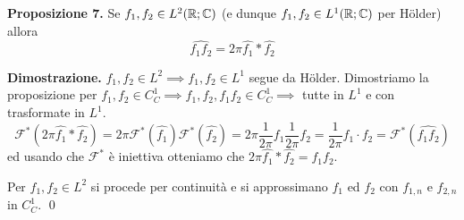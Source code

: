 \textbf{Proposizione 7.}
Se $f_1, f_2 \in L^2(\mathbb R; \mathbb C)$ (e dunque $f_1, f_2 \in L^1(\mathbb R; \mathbb C)$ per H\"older) allora
$$
\hat{f_1 f_2} = 2\pi \hat{f_1} \ast \hat{f_2}
$$

\textbf{Dimostrazione.}
$f_1, f_2 \in L^2 \implies f_1, f_2 \in L^1$ segue da H\"older. Dimostriamo la proposizione per $f_1, f_2 \in C_C^1 \implies f_1, f_2, f_1 f_2 \in C_C^1 \implies$ tutte in $L^1$ e con trasformate in $L^1$.
$$
\mathcal F^*(2\pi \hat{f_1} \ast \hat{f_2})
= 2\pi \mathcal F^*(\hat{f_1}) \mathcal F^*(\hat{f_2})
= 2\pi \frac{1}{2\pi} f_1 \frac{1}{2\pi} f_2
= \frac{1}{2\pi} f_1 \cdot f_2 = \mathcal F^*(\hat{f_1 f_2})
$$
ed usando che $\mathcal F^*$ è iniettiva otteniamo che $2\pi \hat{f_1} \ast \hat{f_2} = \hat{f_1 f_2}$. 

Per $f_1, f_2 \in L^2$ si procede per continuità e si approssimano $f_1$ ed $f_2$ con $f_{1,n}$ e $f_{2,n}$ in $C_C^1$.
\qed








